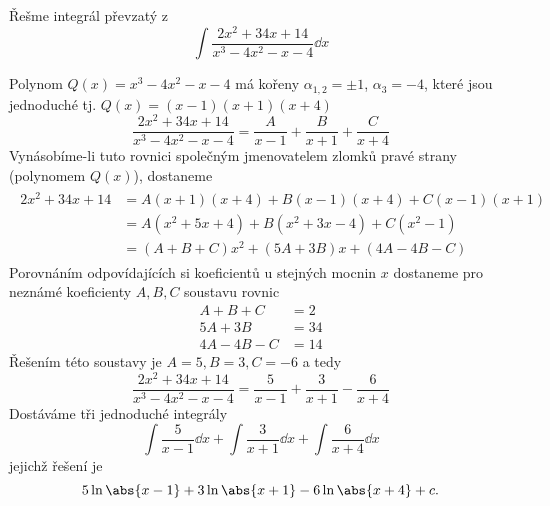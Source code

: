 \begin{mdframed}[style=mdexam]
  \begin{example}\label{MAI:exam115}
    Řešme integrál převzatý z \cite[s.~90]{Knichal}
    \begin{equation}
      \int{\frac{2x^2+34x+14}{x^3-4x^2-x-4}}\dd{x}
    \end{equation}
    
    Polynom $Q(x)=x^3-4x^2-x-4$ má kořeny $\alpha_{1,2}=\pm1$, $\alpha_{3}=-4$, které jsou
    jednoduché tj. $Q(x)=(x-1)(x+1)(x+4)$ $$\frac{2x^2+34x+14}{x^3-4x^2-x-4} =
    \frac{A}{x-1}+\frac{B}{x+1}+\frac{C}{x+4}$$ Vynásobíme-li tuto rovnici společným
    jmenovatelem zlomků pravé strany (polynomem $Q(x)$), dostaneme
    \begin{gather*}
      \begin{align*}
        2x^2+34x+14 &= A(x+1)(x+4)+B(x-1)(x+4)+C(x-1)(x+1) \\
                    &= A(x^2+5x+4)+B(x^2+3x-4)+C(x^2-1)    \\
                    &= (A+B+C)x^2+(5A+3B)x + (4A-4B-C)
      \end{align*}
    \end{gather*}
    Porovnáním odpovídajících si koeficientů u stejných mocnin $x$  dostaneme pro nez\-ná\-mé
    koeficienty $A, B, C$ soustavu rovnic
    \begin{align*}
       A+   B + C &= 2 \\
      5A + 3B     &= 34 \\
      4A - 4B - C &= 14
    \end{align*}
    Řešením této soustavy je $A = 5, B = 3, C = -6$ a tedy
    $$\frac{2x^2+34x+14}{x^3-4x^2-x-4} = \frac{5}{x-1}+\frac{3}{x+1}-\frac{6}{x+4}$$
    Dostáváme tři jednoduché integrály
    \begin{equation*}
      \int{\frac{5}{x-1}}\dd{x} + \int{\frac{3}{x+1}}\dd{x} + \int{\frac{6}{x+4}}\dd{x}            
    \end{equation*}
    jejichž řešení je 
    \begin{equation*}
      5\ln\abs{x-1} +  3\ln\abs{x+1} - 6\ln\abs{x+4} +c.
    \end{equation*}
  \end{example}
\end{mdframed}